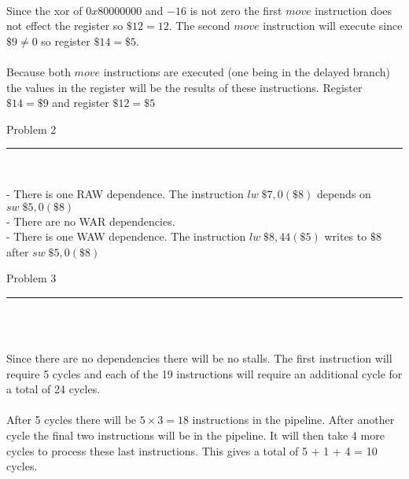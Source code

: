 \documentclass[11pt,reqno]{article}
\begin{document}
\noindent{}\\ 

Since the xor of $0x80000000$ and $-16$ is not zero the first $move$ instruction does not effect the register so $\$12 = 12$. The second $move$ instruction will execute since $\$9 \neq 0$ so register $\$14 = \$5$.\\

\noindent{}\\ 

Because both $move$ instructions are executed (one being in the delayed branch) the values in the register will be the results of these instructions. Register $\$14 = \$9$ and register $\$12 = \$5$
\newpage

\begin{flushleft} 
Problem 2 \\
\rule{500pt}{1pt}\\
\end{flushleft} 

\noindent - There is one RAW dependence. The instruction $lw \; \$7, 0(\$8)$ depends on $sw \; \$5,0(\$8)$\\
\noindent - There are no WAR dependencies.\\
\noindent - There is one WAW dependence. The instruction $lw \; \$8,44(\$5)$ writes to $\$8$ after $sw \; \$5,0(\$8)$ \\

\begin{flushleft} 
Problem 3 \\
\rule{500pt}{1pt}\\
\end{flushleft} 

\noindent{}\\ 

Since there are no dependencies there will be no stalls. The first instruction will require 5 cycles and each of the 19 instructions will require an additional cycle for a total of 24 cycles.\\

\noindent{}\\ 

After 5 cycles there will be $5 \times 3 = 18$ instructions in the pipeline. After another cycle the final two instructions will be in the pipeline. It will then take 4 more cycles to process these last instructions. This gives a total of 5 + 1 + 4 = 10 cycles.\\

\noindent{}\\ 
\end{document}
